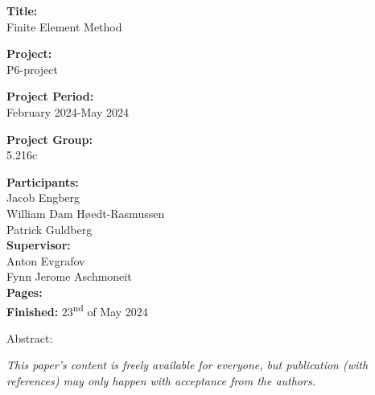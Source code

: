 \begin{minipage}[t]{0.48\textwidth}
\textbf{Title:} \\[5pt]\hspace{2ex}
{Finite Element Method}
\bigskip

\textbf{Project:} \\[5pt]\hspace{2ex}
P6-project
\bigskip

\textbf{Project Period:} \\[5pt]\hspace{2ex}
February 2024-May 2024
\bigskip

\textbf{Project Group:} \\[5pt]\hspace{2ex}
5.216c
\bigskip

\textbf{Participants:} \\ [5pt]\hspace{2ex}%
Jacob Engberg \\%
William Dam Høedt-Rasmussen\\%
Patrick Guldberg \\%

\textbf{Supervisor:} \\ [5pt]\hspace{2ex}%
Anton Evgrafov \\
Fynn Jerome Aschmoneit \\

\textbf{Pages:~\pageref{LastPage}} \\ [5pt]\hspace{2ex}
\textbf{Finished:} 23\textsuperscript{nd} of May 2024

\end{minipage}
\hfill
\begin{minipage}[t]{0.48\textwidth}
Abstract: \\[5pt]
\fbox{\parbox{6.8cm}{\bigskip}}
\end{minipage}
\hspace*{4ex}

\vfill

{\footnotesize \textit{This paper's content is freely available for everyone, but publication (with references) may only happen with acceptance from the authors.}}